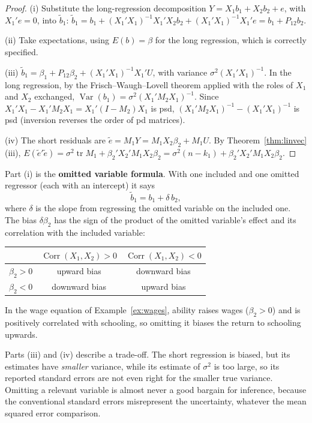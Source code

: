 \documentclass[11pt,a4paper]{article}
\numberwithin{equation}{section}
\DeclareMathOperator{\Var}{Var}
\DeclareMathOperator{\Corr}{Corr}
\DeclareMathOperator{\tr}{tr}
\theoremstyle{definition}
\begin{document}
\begin{proof}
(i) Substitute the long-regression decomposition $Y = X_1b_1 + X_2b_2 + e$, with $X_1'e = 0$, into $\tilde b_1$:
$\tilde b_1 = b_1 + (X_1'X_1)^{-1}X_1'X_2b_2 + (X_1'X_1)^{-1}X_1'e = b_1 + P_{12}b_2$.

(ii) Take expectations, using $E(b) = \beta$ for the long regression, which is correctly specified.

(iii) $\tilde b_1 = \beta_1 + P_{12}\beta_2 + (X_1'X_1)^{-1}X_1'U$, with variance $\sigma^2(X_1'X_1)^{-1}$. In the long regression, by the Frisch--Waugh--Lovell
theorem applied with the roles of $X_1$ and $X_2$ exchanged, $\Var(b_1) = \sigma^2(X_1'M_2X_1)^{-1}$. Since
$X_1'X_1 - X_1'M_2X_1 = X_1'(I - M_2)X_1$ is psd, $(X_1'M_2X_1)^{-1} - (X_1'X_1)^{-1}$ is psd (inversion reverses the order of pd matrices).

(iv) The short residuals are $\tilde e = M_1Y = M_1X_2\beta_2 + M_1U$. By Theorem~\ref{thm:linvec}(iii),
$E(\tilde e'\tilde e) = \sigma^2\tr M_1 + \beta_2'X_2'M_1X_2\beta_2 = \sigma^2(n - k_1) + \beta_2'X_2'M_1X_2\beta_2$.
\end{proof}

Part (i) is the \textbf{omitted variable formula}. With one included and one omitted regressor (each with an intercept) it says
\[
\tilde b_1 = b_1 + \delta\,b_2 ,
\]
where $\delta$ is the slope from regressing the omitted variable on the included one. The bias $\delta\beta_2$ has the sign of the product of the omitted
variable's effect and its correlation with the included variable:
\begin{center}
\begin{tabular}{l|cc}
 & $\Corr(X_1, X_2) > 0$ & $\Corr(X_1, X_2) < 0$\\\hline
$\beta_2 > 0$ & upward bias & downward bias\\
$\beta_2 < 0$ & downward bias & upward bias
\end{tabular}
\end{center}
In the wage equation of Example~\ref{ex:wages}, ability raises wages ($\beta_2 > 0$) and is positively correlated with schooling, so omitting it biases the
return to schooling upwards.

Parts (iii) and (iv) describe a trade-off. The short regression is biased, but its estimates have \emph{smaller} variance, while its estimate of
$\sigma^2$ is too large, so its reported standard errors are not even right for the smaller true variance. Omitting a relevant variable is almost never
a good bargain for inference, because the conventional standard errors misrepresent the uncertainty, whatever the mean squared error comparison.
\end{document}
